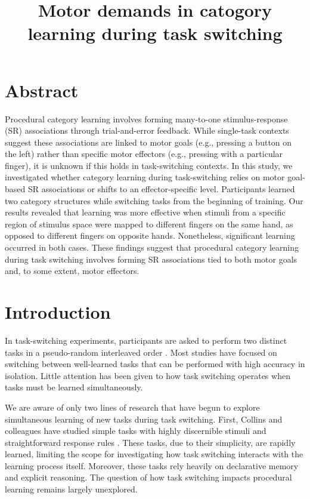 \documentclass[doc, floatsintext]{apa7}
\title{Motor demands in catogory learning during task switching}
\begin{document}
\maketitle
\newpage

\section{Abstract}
Procedural category learning involves forming many-to-one
stimulus-response (SR) associations through trial-and-error
feedback. While single-task contexts suggest these
associations are linked to motor goals (e.g., pressing a
button on the left) rather than specific motor effectors
(e.g., pressing with a particular finger), it is unknown if
this holds in task-switching contexts.  In this study, we
investigated whether category learning during task-switching
relies on motor goal-based SR associations or shifts to an
effector-specific level. Participants learned two category
structures while switching tasks from the beginning of
training. Our results revealed that learning was more
effective when stimuli from a specific region of stimulus
space were mapped to different fingers on the same hand, as
opposed to different fingers on opposite hands. Nonetheless,
significant learning occurred in both cases. These findings
suggest that procedural category learning during task
switching involves forming SR associations tied to both
motor goals and, to some extent, motor effectors.

\section{Introduction}
In task-switching experiments, participants are asked to
perform two distinct tasks in a pseudo-random interleaved
order \parencite{kiesel_control_2010, monsell_task_2003}.
Most studies have focused on switching between well-learned
tasks that can be performed with high accuracy in isolation.
Little attention has been given to how task switching
operates when tasks must be learned simultaneously.

We are aware of only two lines of research that have begun
to explore simultaneous learning of new tasks during task
switching.  First, Collins and colleagues have studied
simple tasks with highly discernible stimuli and
straightforward response rules
\parencite{collins_cognitive_2013, collins_human_2014,
collins_neural_2016, collins_motor_2016, collins_cost_2017}.
These tasks, due to their simplicity, are rapidly learned,
limiting the scope for investigating how task switching
interacts with the learning process itself. Moreover, these
tasks rely heavily on declarative memory and explicit
reasoning. The question of how task switching impacts
procedural learning remains largely unexplored.
\end{document}
